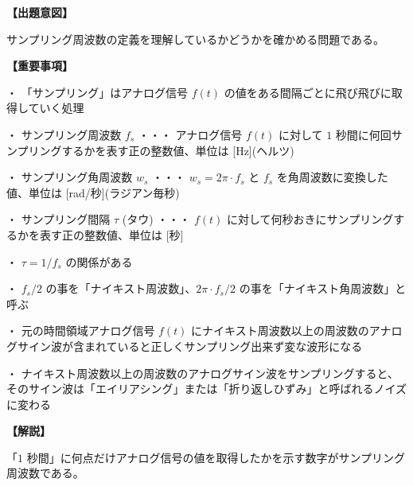 \noindent \textbf{【出題意図】}

\noindent サンプリング周波数の定義を理解しているかどうかを確かめる問題である。

\vspace{1em}
\noindent \textbf{【重要事項】}

\medskip
\noindent ・ 「サンプリング」はアナログ信号 $f(t)$ の値をある間隔ごとに飛び飛びに取得していく処理

\medskip
\noindent ・ サンプリング周波数 $f_s$ ・・・ アナログ信号 $f(t)$ に対して $1$ 秒間に何回サンプリングするかを表す正の整数値、単位は [Hz](ヘルツ)

\medskip
\noindent ・ サンプリング角周波数 $w_s$ ・・・ $w_s = 2\pi\cdot f_s$ と $f_s$ を角周波数に変換した値、単位は [rad/秒](ラジアン毎秒)

\medskip
\noindent ・ サンプリング間隔 $\tau$ (タウ) ・・・ $f(t)$ に対して何秒おきにサンプリングするかを表す正の整数値、単位は [秒]

\medskip
\noindent ・ $\tau = 1/f_s$ の関係がある

\medskip
\noindent ・ $f_s/2$ の事を「ナイキスト周波数」、$2\pi \cdot f_s/2$ の事を「ナイキスト角周波数」と呼ぶ

\medskip
\noindent ・ 元の時間領域アナログ信号 $f(t)$ にナイキスト周波数以上の周波数のアナログサイン波が含まれていると正しくサンプリング出来ず変な波形になる

\medskip
\noindent ・ ナイキスト周波数以上の周波数のアナログサイン波をサンプリングすると、そのサイン波は「エイリアシング」または「折り返しひずみ」と呼ばれるノイズに変わる

\vspace{1em}
\noindent \textbf{【解説】}

\noindent 「$1$ 秒間」に何点だけアナログ信号の値を取得したかを示す数字がサンプリング周波数である。
